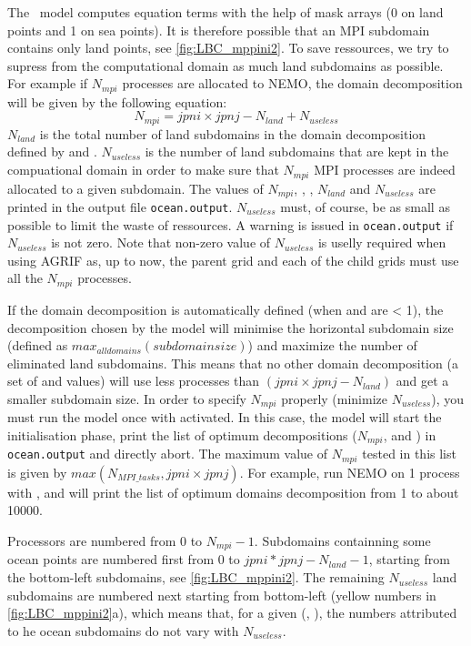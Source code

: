 \documentclass[../main/NEMO_manual]{subfiles}
\begin{document}
The \NEMO\ model computes equation terms with the help of mask arrays (0 on land points and 1 on sea points). It is therefore possible that an MPI subdomain contains only land points, see \autoref{fig:LBC_mppini2}. To save ressources, we try to supress from the computational domain as much land subdomains as possible. For example if $N_{mpi}$ processes are allocated to NEMO, the domain decomposition will be given by the following equation:
\[
  N_{mpi} = jpni \times jpnj - N_{land} + N_{useless}
\]
$N_{land}$ is the total number of land subdomains in the domain decomposition defined by  and . $N_{useless}$ is the number of land subdomains that are kept in the compuational domain in order to make sure that $N_{mpi}$ MPI processes are indeed allocated to a given subdomain. The values of $N_{mpi}$, , ,  $N_{land}$ and $N_{useless}$ are printed in the output file \texttt{ocean.output}. $N_{useless}$ must, of course, be as small as possible to limit the waste of ressources. A warning is issued in  \texttt{ocean.output} if $N_{useless}$ is not zero. Note that non-zero value of $N_{useless}$ is uselly required when using AGRIF as, up to now, the parent grid and each of the child grids must use all the $N_{mpi}$ processes.

If the domain decomposition is automatically defined (when  and  are < 1), the decomposition chosen by the model will minimise the horizontal subdomain size (defined as $max_{all domains}(subdomain size)$) and maximize the number of eliminated land subdomains. This means that no other domain decomposition (a set of  and  values) will use less processes than $(jpni  \times  jpnj - N_{land})$ and get a smaller subdomain size.
In order to specify $N_{mpi}$ properly (minimize $N_{useless}$), you must run the model once with  activated. In this case, the model will start the initialisation phase, print the list of optimum decompositions ($N_{mpi}$,  and ) in \texttt{ocean.output} and directly abort. The maximum value of $N_{mpi}$ tested in this list is given by $max(N_{MPI\_tasks}, jpni \times jpnj)$. For example, run NEMO on 1 process with ,  and  will print the list of optimum domains decomposition from 1 to about 10000.

Processors are numbered from 0 to $N_{mpi} - 1$. Subdomains containning some ocean points are numbered first from 0 to $jpni * jpnj - N_{land} -1$, starting from the bottom-left subdomains, see \autoref{fig:LBC_mppini2}. The remaining $N_{useless}$ land subdomains are numbered next starting from bottom-left (yellow numbers in \autoref{fig:LBC_mppini2}a), which means that, for a given (, ), the numbers attributed to he ocean subdomains do not vary with $N_{useless}$.
\end{document}
